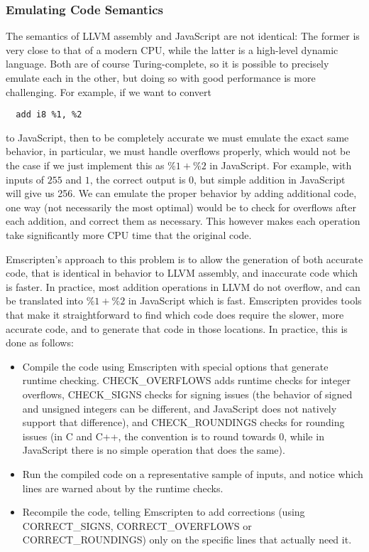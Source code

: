 \documentclass[11pt]{proc}
\begin{document}
\subsubsection{Emulating Code Semantics}
\label{sssec:realworldcode}

The semantics of LLVM assembly and JavaScript are not identical: The former
is very close to that of a modern CPU, while the latter is a high-level
dynamic language. Both are of course Turing-complete, so it is possible to
precisely emulate each in the other, but doing so with good performance is
more challenging. For example, if we want to convert
\begin{verbatim}
  add i8 %1, %2
\end{verbatim}
to JavaScript, then to be completely accurate we must emulate the
exact same behavior, in particular, we must handle overflows properly, which would not be the case if we just implement
this as $\%1 + \%2$ in JavaScript. For example, with inputs of $255$ and $1$, the
correct output is 0, but simple addition in JavaScript will give us 256. We
can emulate the proper behavior by adding additional code, one way
(not necessarily the most optimal) would be to check for overflows after
each addition, and correct them as necessary. This however makes each
operation take significantly more CPU time that the original code.

Emscripten's approach to this problem is to allow the generation of both accurate code,
that is identical in behavior to LLVM assembly, and inaccurate code which is
faster. In practice, most addition operations in LLVM do not overflow,
and can be translated into $\%1 + \%2$ in JavaScript which is fast. Emscripten
provides tools that make it straightforward to find which code does require
the slower, more accurate code, and to generate that code in those locations.
In practice, this is done as follows:

\begin{itemize}
\item Compile the code using Emscripten with special options that generate runtime checking.
      CHECK\_OVERFLOWS adds runtime checks for integer overflows, CHECK\_SIGNS
      checks for signing issues (the behavior of signed and unsigned integers can
      be different, and JavaScript does not natively support that difference), and
      CHECK\_ROUNDINGS checks for rounding issues (in C and C++, the convention is
      to round towards 0, while in JavaScript there is no simple operation that does
      the same).
\item Run the compiled code on a representative sample of inputs, and notice which
      lines are warned about by the runtime checks.
\item Recompile the code, telling Emscripten to add corrections (using CORRECT\_SIGNS, CORRECT\_OVERFLOWS
      or CORRECT\_ROUNDINGS) only on the specific lines that actually need it.
\end{itemize}
\end{document}
